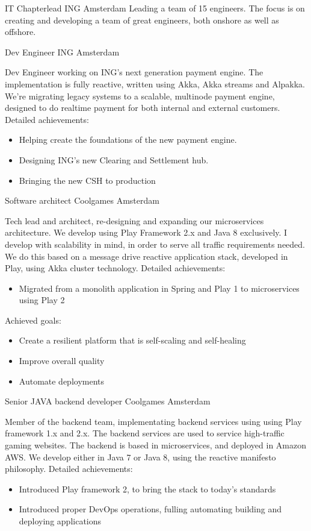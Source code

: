 \documentclass[11pt,a4paper]{moderncv}
\begin{document}
{IT Chapterlead}
{ING}
{Amsterdam}
{}
{
    Leading a team of 15 engineers. The focus is on creating and developing
    a team of great engineers, both onshore as well as offshore.
}

{Dev Engineer}
{ING}
{Amsterdam}
{}
{
    Dev Engineer working on ING's next generation payment engine. 
    The implementation is fully reactive, written using Akka,
    Akka streams and Alpakka.
    We're migrating legacy systems to a scalable, multinode payment
    engine, designed to do realtime payment for both internal and
    external customers.
    \newline{}%
    Detailed achievements:%
    \begin{itemize}
        \item Helping create the foundations of the new payment engine.
        \item Designing ING's new Clearing and Settlement hub.
        \item Bringing the new CSH to production
    \end{itemize}
}

{Software architect}
{Coolgames}
{Amsterdam}
{}
{
    Tech lead and architect, re-designing and expanding our microservices
    architecture. We develop using Play Framework 2.x and Java 8 exclusively.
    I develop with scalability in mind, in order to serve all traffic
    requirements needed. We do this based on a message drive reactive
    application stack, developed in Play, using Akka cluster technology.
    \newline{}%
    Detailed achievements:%
    \begin{itemize}
        \item Migrated from a monolith application in Spring and Play 1 to microservices using Play 2
    \end{itemize}
    Achieved goals:%
    \begin{itemize}
        \item Create a resilient platform that is self-scaling and self-healing
        \item Improve overall quality
        \item Automate deployments
    \end{itemize}
}

{Senior JAVA backend developer}
{Coolgames}
{Amsterdam}
{}
{
    Member of the backend team, implementating backend services using using Play framework 1.x and 2.x.
    The backend services are used to service high-traffic gaming websites. The backend is based 
    in microservices, and deployed in Amazon AWS.
    We develop either in Java 7 or Java 8, using the reactive manifesto philosophy.\newline{}%
    \newline{}%
    Detailed achievements:%
    \begin{itemize}
        \item Introduced Play framework 2, to bring the stack to today's standards
        \item Introduced proper DevOps operations, fulling automating building and deploying applications
    \end{itemize}
}
\end{document}
